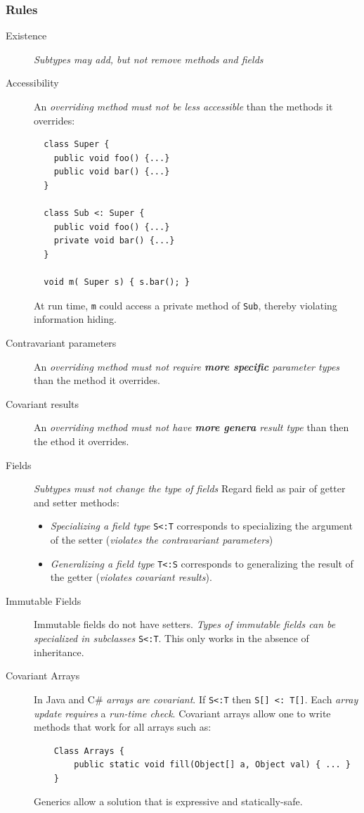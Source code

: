 \subsubsection{Rules}
\begin{description}
 \item[Existence] \emph{Subtypes may add, but not remove methods and fields}
 \item[Accessibility] An \emph{overriding method must not be less accessible} than the methods it overrides:
 \begin{lstlisting}
  class Super {
    public void foo() {...}
    public void bar() {...}
  }
  
  class Sub <: Super {
    public void foo() {...}
    private void bar() {...} 
  }
  
  void m( Super s) { s.bar(); }
 \end{lstlisting}
 At run time, \lstinline{m} could access a private method of \lstinline{Sub}, thereby violating information hiding.
 \item[Contravariant parameters] An \emph{overriding method must not require \textbf{more specific} parameter types} than the method it overrides.
 \item[Covariant results] An \emph{overriding method must not have \textbf{more genera} result type} than then the ethod it overrides. 
 \item[Fields] \emph{Subtypes must not change the type of fields}
 	Regard field as pair of getter and setter methods:
 	\begin{itemize}
 		\item \emph{Specializing a field type} \lstinline{S<:T} corresponds to specializing the argument of the setter (\emph{violates the contravariant parameters})
 		\item \emph{Generalizing a field type} \lstinline{T<:S} corresponds to generalizing the result of the getter (\emph{violates covariant results}).
 		
 	\end{itemize}
 \item[Immutable Fields] Immutable fields do not have setters. \emph{Types of immutable fields can be specialized in subclasses} \lstinline{S<:T}. This only works in the absence of inheritance. 
 \item[Covariant Arrays] In Java and C\# \emph{arrays are covariant}. If \lstinline{S<:T} then \lstinline{S[] <: T[]}. Each \emph{array update requires} a \emph{run-time check}. Covariant arrays allow one to write methods that work for all arrays  such as:
 	\begin{lstlisting}
 	Class Arrays {
 		public static void fill(Object[] a, Object val) { ... }
 	}
 	\end{lstlisting}
	Generics allow a solution that is expressive and statically-safe. 
\end{description}

